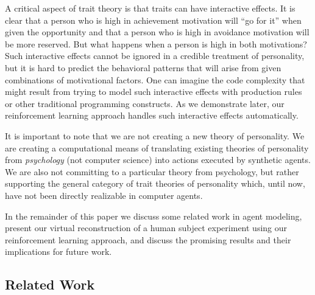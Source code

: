 A critical aspect of trait theory is that traits can have interactive effects.  It is clear that a person who is high in achievement motivation will ``go for it'' when given the opportunity and that a person who is high in avoidance motivation will be more reserved.  But what happens when a person is high in both motivations?  Such interactive effects cannot be ignored in a credible treatment of personality, but it is hard to predict the behavioral patterns that will arise from given combinations of motivational factors.  One can imagine the code complexity that might result from trying to model such interactive effects with production rules or other traditional programming constructs.  As we demonstrate later, our reinforcement learning approach handles such interactive effects automatically.

It is important to note that we are not creating a new theory of personality.  We are creating a computational means of translating existing theories of personality from {\em psychology} (not computer science) into actions executed by synthetic agents.  We are also not committing to a particular theory from psychology, but rather supporting the general category of trait theories of personality which, until now, have not been directly realizable in computer agents.

In the remainder of this paper we discuss some related work in agent modeling, present our virtual reconstruction of a human subject experiment using our reinforcement learning approach, and discuss the promising results and their implications for future work.


\subsection{Related Work}\label{sec:related-work}

